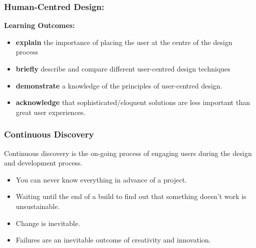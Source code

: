\begin{frame}
	\frametitle{Human-Centred Design:}
	
	\textbf{Learning Outcomes:}
	
	\begin{itemize}
		\item \textbf{explain} the importance of placing the user at the centre of the design process
		\item \textbf{briefly} describe and compare different user-centred design techniques
		\item \textbf{demonstrate} a knowledge of the principles of user-centred design.	
		\item \textbf{acknowledge} that sophisticated/eloquent solutions are less important than great user experiences. 
	\end{itemize}
\end{frame}



\begin{frame}
	\frametitle{Continuous Discovery}
	Continuous discovery is the on-going process of engaging users during the design and development process. 
	\begin{itemize}
		\item \pause You can never know everything in advance of a project.
		\item \pause Waiting until the end of a build to find out that something doesn't work is unsustainable. 
		\item \pause Change is inevitable.
		\item \pause Failures are an inevitable outcome of creativity and innovation. 
	\end{itemize}
\end{frame}	

